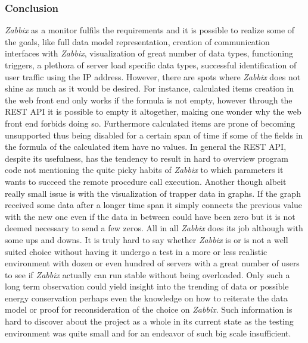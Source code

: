\subsubsection{Conclusion}
	\textit{Zabbix} as a monitor fulfils the requirements and it is possible to realize some of the goals, like full data model representation, creation of communication interfaces with \textit{Zabbix}, visualization of great number of data types, functioning triggers, a plethora of server load specific data types, successful identification of user traffic using the IP address. However, there are spots where \textit{Zabbix} does not shine as much as it would be desired. For instance, calculated items creation in the web front end only works if the formula is not empty, however through the REST API it is possible to empty it altogether, making one wonder why the web front end forbids doing so. Furthermore calculated items are prone of becoming unsupported thus being disabled for a certain span of time if some of the fields in the formula of the calculated item have no values. In general the REST API, despite its usefulness, has the tendency to result in hard to overview program code not mentioning the quite picky habits of \textit{Zabbix} to which parameters it wants to succeed the remote procedure call execution. Another though albeit really small issue is with the visualization of trapper data in graphs. If the graph received some data after a longer time span it simply connects the previous value with the new one even if the data in between could have been zero but it is not deemed necessary to send a few zeros.
	All in all \textit{Zabbix} does its job although with some ups and downs. It is truly hard to say whether \textit{Zabbix} is or is not a well suited choice without having it undergo a test in a more or less realistic environment with dozen or even hundred of servers with a great number of users to see if \textit{Zabbix} actually can run stable without being overloaded. Only such a long term observation could yield insight into the trending of data or possible energy conservation perhaps even the knowledge on how to reiterate the data model or proof for reconsideration of the choice on \textit{Zabbix}. Such information is hard to discover about the project as a whole in its current state as the testing environment was quite small and for an endeavor of such big scale insufficient.